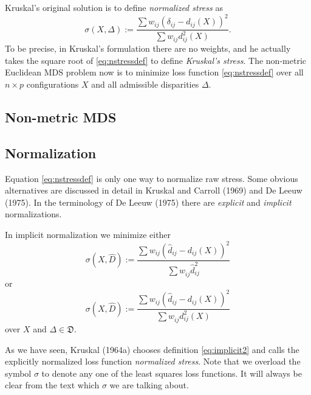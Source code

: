 \documentclass[
  12pt,
]{article}
\begin{document}
Kruskal's original solution is to define \emph{normalized stress} as
\begin{equation}
\sigma(X,\Delta):=\frac{\sum w_{ij}(\delta_{ij}-d_{ij}(X))^2}{\sum w_{ij}d_{ij}^2(X)}.
\label{eq:nstressdef}
\end{equation}
To be precise, in Kruskal's formulation there are no weights,
and he actually takes the square root of \eqref{eq:nstressdef} to define
\emph{Kruskal's stress}. The non-metric Euclidean MDS problem now is to minimize
loss function \eqref{eq:nstressdef} over all \(n\times p\) configurations
\(X\) and all admissible disparities \(\Delta\).

\subsection{Non-metric MDS}\label{non-metric-mds}

\subsection{Normalization}\label{normalization}

Equation \eqref{eq:nstressdef} is only one way to normalize raw stress.
Some obvious alternatives are discussed in detail in
Kruskal and Carroll (1969) and De Leeuw (1975). In the terminology of
De Leeuw (1975) there are \emph{explicit} and \emph{implicit} normalizations.

In implicit normalization we minimize either
\begin{equation}
\sigma(X,\hat D):=\frac{\sum  w_{ij}(\hat d_{ij} -d_{ij}(X))^2}{\sum   w_{ij}^{\ }\hat d_{ij}^2}
\label{eq:implicit1}
\end{equation}
or
\begin{equation}
\sigma(X,\hat D):=\frac{\sum   w_{ij}(\hat d_{ij}-d_{ij}(X))^2}{\sum   w_{ij}^{\ }d_{ij}^2(X) }
\label{eq:implicit2}
\end{equation}
over \(X\) and \(\Delta\in\mathfrak{D}\).

As we have seen, Kruskal (1964a) chooses definition \eqref{eq:implicit2} and
calls the explicitly normalized loss function \emph{normalized stress}. Note that we overload the symbol \(\sigma\) to denote any one of the least squares loss
functions. It will always be clear from the text which \(\sigma\) we are
talking about.
\end{document}
